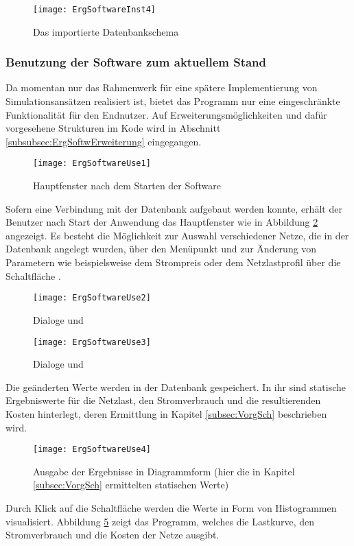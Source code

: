 \begin{figure}[htb]
	\centering
	\texttt{[image: ErgSoftwareInst4]}
	\caption{Das importierte Datenbankschema }
	\label{fig:ErgSoftwareInst4}
\end{figure}

\subsubsection{Benutzung der Software zum aktuellem Stand}
Da momentan nur das Rahmenwerk für eine spätere Implementierung von Simulationsansätzen realisiert ist, bietet das Programm nur eine eingeschränkte Funktionalität für den Endnutzer. Auf Erweiterungsmöglichkeiten und dafür vorgesehene Strukturen im Kode wird in Abschnitt \ref{subsubsec:ErgSoftwErweiterung} eingegangen.
\begin{figure}[htb]
	\centering
	\texttt{[image: ErgSoftwareUse1]}
	\caption{Hauptfenster nach dem Starten der Software}
	\label{fig:ErgSoftwareUse1}
\end{figure}
Sofern eine Verbindung mit der Datenbank aufgebaut werden konnte, erhält der Benutzer nach Start der Anwendung das Hauptfenster wie in Abbildung \ref{fig:ErgSoftwareUse1} angezeigt. Es besteht die Möglichkeit zur Auswahl verschiedener Netze, die in der Datenbank angelegt wurden, über den Menüpunkt  und zur Änderung von Parametern wie beispielsweise dem Strompreis oder dem Netzlastprofil über die Schaltfläche .
\begin{figure}[htb]
	\centering
	\texttt{[image: ErgSoftwareUse2]}
	\caption{Dialoge  und }
	\label{fig:ErgSoftwareUse2}
\end{figure}
\begin{figure}[htb]
	\centering
	\texttt{[image: ErgSoftwareUse3]}
	\caption{Dialoge  und }
	\label{fig:ErgSoftwareUse3}
\end{figure}
Die geänderten Werte werden in der Datenbank gespeichert. In ihr sind statische Ergebniswerte für die Netzlast, den Stromverbrauch und die resultierenden Kosten hinterlegt, deren Ermittlung in Kapitel \ref{subsec:VorgSch} beschrieben wird.
\begin{figure}[!htb]
	\centering
	\texttt{[image: ErgSoftwareUse4]}
	\caption{Ausgabe der Ergebnisse in Diagrammform (hier die in Kapitel \ref{subsec:VorgSch} ermittelten statischen Werte)}
	\label{fig:ErgSoftwareUse4}
\end{figure}
Durch Klick auf die Schaltfläche  werden die Werte in Form von Histogrammen visualisiert. Abbildung \ref{fig:ErgSoftwareUse4} zeigt das Programm, welches die Lastkurve, den Stromverbrauch und die Kosten der Netze ausgibt.


